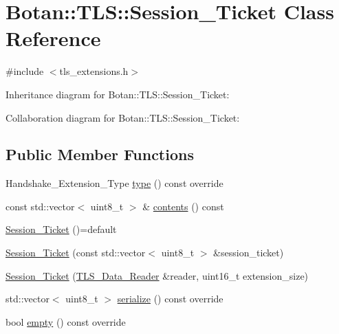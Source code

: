 \hypertarget{class_botan_1_1_t_l_s_1_1_session___ticket}{}\section{Botan\+:\+:T\+LS\+:\+:Session\+\_\+\+Ticket Class Reference}
\label{class_botan_1_1_t_l_s_1_1_session___ticket}


{\ttfamily \#include $<$tls\+\_\+extensions.\+h$>$}



Inheritance diagram for Botan\+:\+:T\+LS\+:\+:Session\+\_\+\+Ticket\+:


Collaboration diagram for Botan\+:\+:T\+LS\+:\+:Session\+\_\+\+Ticket\+:
\subsection*{Public Member Functions}
\begin{DoxyCompactItemize}
\item 
Handshake\+\_\+\+Extension\+\_\+\+Type \mbox{\hyperlink{class_botan_1_1_t_l_s_1_1_session___ticket_a0fb84fe33c30d28e0dee120ecc2fe228}{type}} () const override
\item 
const std\+::vector$<$ uint8\+\_\+t $>$ \& \mbox{\hyperlink{class_botan_1_1_t_l_s_1_1_session___ticket_abe74c7dc9a16b878f02694e62364243d}{contents}} () const
\item 
\mbox{\hyperlink{class_botan_1_1_t_l_s_1_1_session___ticket_a362933f62a9c5d9eb8d06a2545cf78a1}{Session\+\_\+\+Ticket}} ()=default
\item 
\mbox{\hyperlink{class_botan_1_1_t_l_s_1_1_session___ticket_a24f03efc3f21477de5c5be578f53dd69}{Session\+\_\+\+Ticket}} (const std\+::vector$<$ uint8\+\_\+t $>$ \&session\+\_\+ticket)
\item 
\mbox{\hyperlink{class_botan_1_1_t_l_s_1_1_session___ticket_a677e88a19f33368be6ffa73b2b86a58a}{Session\+\_\+\+Ticket}} (\mbox{\hyperlink{class_botan_1_1_t_l_s_1_1_t_l_s___data___reader}{T\+L\+S\+\_\+\+Data\+\_\+\+Reader}} \&reader, uint16\+\_\+t extension\+\_\+size)
\item 
std\+::vector$<$ uint8\+\_\+t $>$ \mbox{\hyperlink{class_botan_1_1_t_l_s_1_1_session___ticket_a446a320f05bfc710740defcd5ac0ca58}{serialize}} () const override
\item 
bool \mbox{\hyperlink{class_botan_1_1_t_l_s_1_1_session___ticket_a6796d47c184b69f1eaf5bcee582a4ebe}{empty}} () const override
\end{DoxyCompactItemize}
